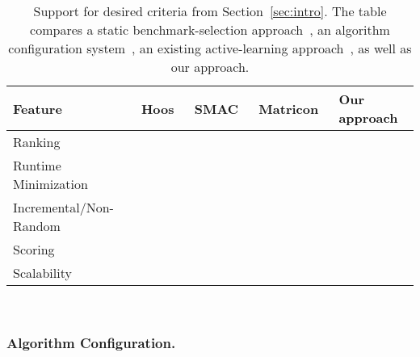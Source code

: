 \documentclass[runningheads]{llncs}
\newcommand{\cmark}{\ding{51}} %
\newcommand{\xmark}{\ding{55}}
\begin{document}
\begin{table}[tbp]
  \centering
  \begin{tabular}{
    m{}
    >{\centering\arraybackslash}m{}
    >{\centering\arraybackslash}m{}
    >{\centering\arraybackslash}m{}
    >{\centering\arraybackslash}m{}
  }
    \hline
    Feature & Hoos~\cite{HoosKSS13} & SMAC~\cite{HutterHL11} & Matricon~\cite{MatriconAFSH21} & Our approach \\
    \hline
    Ranking & \cmark & \xmark & \cmark & \cmark \\
    Runtime Minimization & \xmark & \cmark & \cmark & \cmark \\
    Incremental/Non-Random & \xmark & \xmark & \cmark & \cmark \\
    Scoring & \cmark & \xmark & \xmark & \cmark \\
    Scalability & \cmark & \cmark & \xmark & \cmark \\
    \hline
  \end{tabular}
  ~\\[1em]
  \caption{Support for desired criteria from Section~\ref{sec:intro}.
	The table compares a static benchmark-selection approach~\cite{HoosKSS13}, an algorithm configuration system~\cite{HutterHL11}, an existing active-learning approach~\cite{MatriconAFSH21}, as well as our approach.
  }
  \label{tab:requirements}
\end{table}

\subsubsection{Algorithm Configuration.}
\end{document}
